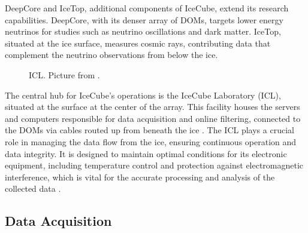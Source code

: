 DeepCore and IceTop, additional components of IceCube, extend its research capabilities.
DeepCore, with its denser array of DOMs, targets lower energy neutrinos for studies such as neutrino oscillations and dark matter.
IceTop, situated at the ice surface, measures cosmic rays, contributing data that complement the neutrino observations from below the ice.

\begin{figure}
    \caption{ICL. Picture from \cite{IceCube_SPGallery}.}
    \label{fig:ICL}
\end{figure}

The central hub for IceCube's operations is the IceCube Laboratory (ICL), situated at the surface at the center of the array.
This facility houses the servers and computers responsible for data acquisition and online filtering, connected to the DOMs via cables routed up from beneath the ice \cite{IC3_thedetector}.
The ICL plays a crucial role in managing the data flow from the ice, ensuring continuous operation and data integrity.
It is designed to maintain optimal conditions for its electronic equipment, including temperature control and protection against electromagnetic interference, which is vital for the accurate processing and analysis of the collected data \cite{IC3_thedetector}.


\subsection{Data Acquisition}

